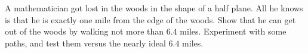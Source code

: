 A mathematician got lost in the woods in the shape of a half plane. All he knows is that he is exactly one mile from the edge of the woods. Show that he can get out of the woods by walking not more than $6.4$ miles. Experiment with some paths, and test them versus the nearly ideal $6.4$ miles.
